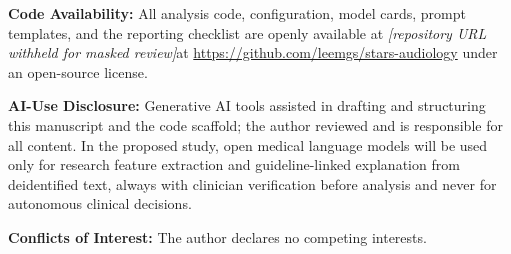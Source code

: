 \textbf{Code Availability:} All analysis code, configuration, model cards, prompt templates, and the reporting checklist are openly available \ifblind at \emph{[repository URL withheld for masked review]}\else at \url{https://github.com/leemgs/stars-audiology}\fi{} under an open-source license.

\textbf{AI-Use Disclosure:} Generative AI tools assisted in drafting and structuring this manuscript and the code scaffold; the author reviewed and is responsible for all content. In the proposed study, open medical language models will be used only for research feature extraction and guideline-linked explanation from deidentified text, always with clinician verification before analysis and never for autonomous clinical decisions.

\textbf{Conflicts of Interest:} The author declares no competing interests.
